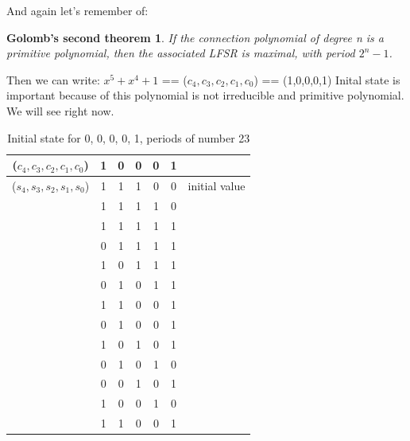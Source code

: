 \documentclass[a4paper, 11pt]{article}
\begin{document}
And again let's remember of:

\newtheorem*{thm1}{Golomb's second theorem}
\begin{thm1}
    If the connection polynomial of degree n is a primitive polynomial, then the associated LFSR is maximal, with period $2^{n}-1$.
\end{thm1}
Then we can write: $x^{5}+x^{4}+1$ == ($c_{4}, c_{3}, c_{2}, c_{1}, c_{0} $) == (1,0,0,0,1)
Inital state is important because of this polynomial is not irreducible and primitive polynomial. We will see right now.

\begin{table}[htbp]
    \centering
    \caption{Initial state for 0, 0, 0, 0, 1, periods of number 23}
      \begin{tabular}{rcccccl}
      \hline
      \multicolumn{1}{c}{($c_{4}, c_{3}, c_{2}, c_{1}, c_{0} $)} & 1     & 0     & 0     & 0     & 1     &  \bigstrut\\
      \hline
      \multicolumn{1}{c}{($s_{4}, s_{3}, s_{2}, s_{1}, s_{0} $)} & 1     & 1     & 1     & 0     & 0     & initial value \bigstrut\\
      \hline
      \multirow{3}[6]{*}{} & 1     & 1     & 1     & 1     & 0     & \multirow{2}[4]{*}{} \bigstrut\\
  \cline{2-6}          & 1     & 1     & 1     & 1     & 1     &  \bigstrut\\
  \cline{2-6}          & 0     & 1     & 1     & 1     & 1     &  \bigstrut\\
  \cline{2-6}          & 1     & 0     & 1     & 1     & 1     &  \bigstrut\\
  \cline{2-6}          & 0     & 1     & 0     & 1     & 1     &  \bigstrut\\
  \cline{2-6}          & 1     & 1     & 0     & 0     & 1     &  \bigstrut\\
  \cline{2-6}          & 0     & 1     & 0     & 0     & 1     &  \bigstrut\\
  \cline{2-6}          & 1     & 0     & 1     & 0     & 1     &  \bigstrut\\
  \cline{2-6}          & 0     & 1     & 0     & 1     & 0     &  \bigstrut\\
  \cline{2-6}          & 0     & 0     & 1     & 0     & 1     &  \bigstrut\\
  \cline{2-6}          & 1     & 0     & 0     & 1     & 0     &  \bigstrut\\
  \cline{2-6}          & 1     & 1     & 0     & 0     & 1     &  \bigstrut\\

\end{tabular}
\end{table}
\end{document}
